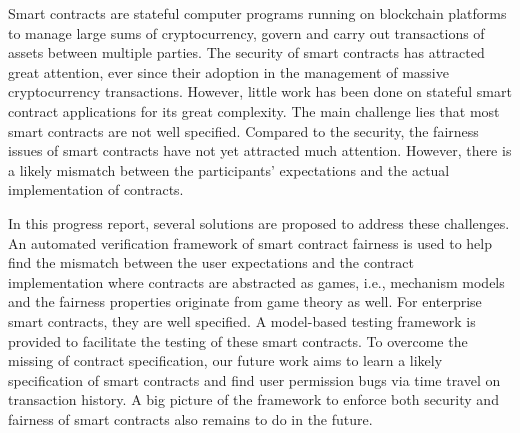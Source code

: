 \documentclass[12pt,a4paper]{Thesis} %
\begin{document}

Smart contracts are stateful computer programs running on blockchain platforms to manage large sums of
cryptocurrency, govern and carry out transactions of assets between multiple parties.
The security of smart contracts has attracted great attention, ever since their adoption in the management of massive cryptocurrency transactions.
However, little work has been done on stateful smart contract applications for its great complexity.
The main challenge lies that most smart contracts are not well specified.
Compared to the security, the fairness issues of smart contracts have not yet attracted much attention. 
However, there is a likely mismatch between the participants' expectations and the actual implementation of contracts.

In this progress report, several solutions are proposed to address these challenges.
An automated verification framework of smart contract fairness is used to help find the mismatch between the user expectations and the contract implementation where contracts are abstracted as games, i.e., mechanism models and the fairness properties originate from game theory as well.
For enterprise smart contracts, they are well specified.
A model-based testing framework is provided to facilitate the testing of these smart contracts.
To overcome the missing of contract specification, our future work aims to learn a likely specification of smart contracts and find user permission bugs via time travel on transaction history. 
A big picture of the framework to enforce both security and fairness of smart contracts also remains to do in the future.


\tableofcontents %

\listoffigures %

\listoftables %


\end{document}
